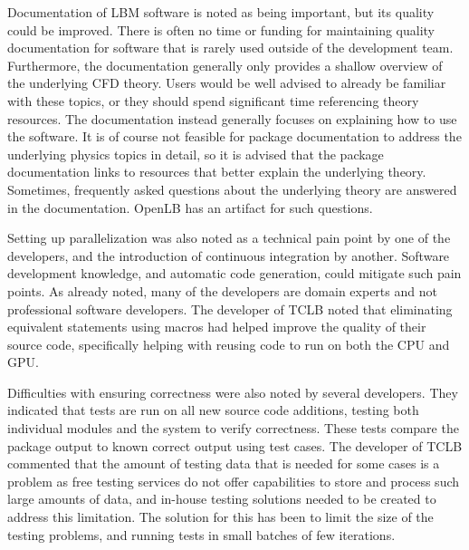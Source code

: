 \documentclass[12pt, notitlepage]{article}
\begin{document}
Documentation of LBM software is noted as being important, but its quality could be improved. There is often no time or funding for maintaining quality documentation for software that is rarely used outside of the development team. Furthermore, the documentation generally only provides a shallow overview of the underlying CFD theory. Users would be well advised to already be familiar with these topics, or they should spend significant time referencing theory resources. The documentation instead generally focuses on explaining how to use the software. It is of course not feasible for package documentation to address the underlying physics topics in detail, so it is advised that the package documentation links to resources that better explain the underlying theory. Sometimes, frequently asked questions about the underlying theory are answered in the documentation. OpenLB has an artifact for such questions.

Setting up parallelization was also noted as a technical pain point by one of the developers, and the introduction of continuous integration by another. Software development knowledge, and automatic code generation, could mitigate such pain points. As already noted, many of the developers are domain experts and not professional software developers. The developer of TCLB noted that eliminating equivalent statements using macros had helped improve the quality of their source code, specifically helping with reusing code to run on both the CPU and GPU. 

Difficulties with ensuring correctness were also noted by several developers. They indicated that tests are run on all new source code additions, testing both individual modules and the system to verify correctness. These tests compare the package output to known correct output using test cases. The developer of TCLB commented that the amount of testing data that is needed for some cases is a problem as free testing services do not offer capabilities to store and process such large amounts of data, and in-house testing solutions needed to be created to address this limitation. The solution for this has been to limit the size of the testing problems, and running tests in small batches of few iterations.
\end{document}
